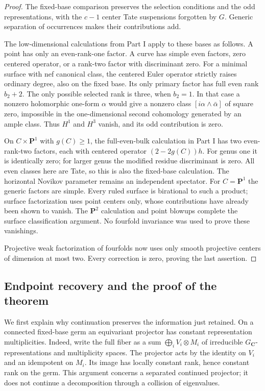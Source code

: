 \documentclass[11pt]{article}
\newcommand{\C}{\mathbf C}
\newcommand{\PP}{\mathbf P}
\begin{document}
\begin{proof}
The fixed-base comparison preserves the selection conditions and the odd
representations, with the $c-1$ center Tate suspensions forgotten by $G$.
Generic separation of occurrences makes their contributions add.

The low-dimensional calculations from Part I apply to these bases as
follows. A point has only an even-rank-one factor. A curve has simple even
factors, zero centered operator, or a rank-two factor with discriminant
zero. For a minimal surface with nef canonical class, the centered Euler
operator strictly raises ordinary degree, also on the fixed base. Its
only primary factor has full even rank $b_2+2$. The only possible selected
rank is three, when $b_2=1$. In that case a nonzero holomorphic one-form
$\alpha$ would give a nonzero class $[i\alpha\wedge\bar\alpha]$ of square
zero, impossible in the one-dimensional second cohomology generated by
an ample class. Thus $H^1$ and $H^3$ vanish, and its odd contribution is zero.

On $C\times\PP^1$ with $g(C)\geq1$, the full-even-bulk calculation in
Part I has two even-rank-two factors, each with centered operator
$(2-2g(C))h$. For genus one it is identically zero; for larger genus the
modified residue discriminant is zero. All even classes here are Tate,
so this is also the fixed-base calculation. The horizontal Novikov
parameter remains an independent spectator. For $C=\PP^1$ the generic
factors are simple. Every ruled surface is birational to such a product;
surface factorization uses point centers only, whose contributions have
already been shown to vanish. The $\PP^2$ calculation and point blowups
complete the surface classification argument. No fourfold invariance was
used to prove these vanishings.

Projective weak factorization of fourfolds now uses only smooth projective
centers of dimension at most two. Every correction is zero, proving the
last assertion.
\end{proof}

\subsection{Endpoint recovery and the proof of the theorem}

We first explain why continuation preserves the information just retained.
On a connected fixed-base germ an equivariant projector has constant
representation multiplicities. Indeed, write the full fiber as a sum
$\bigoplus_i V_i\otimes M_i$ of irreducible $G_\C$-representations and
multiplicity spaces. The projector acts by the identity on $V_i$ and an
idempotent on $M_i$. Its image has locally constant rank, hence constant
rank on the germ. This argument concerns a separated continued projector;
it does not continue a decomposition through a collision of eigenvalues.
\end{document}
